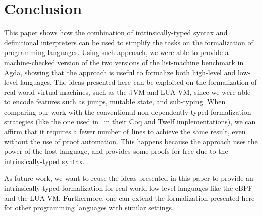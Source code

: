 \documentclass[review]{elsarticle}
\theoremstyle{definition}
\begin{document}
\vspace{-3ex}

\section{Conclusion}\label{sec:conclusion}

This paper shows how the combination of intrinsically-typed syntax and definitional interpreters can be used to simplify
the tasks on the formalization of programming languages. Using such approach, we were able to provide a machine-checked
version of the two versions of the list-machine benchmark in Agda, showing that the approach is useful to
formalize both high-level and low-level languages.
The ideas presented here can be exploited on the formalization of real-world virtual machines, such as the JVM and LUA VM,
since we were able to encode features such as jumps, mutable state, and sub-typing. When comparing our work with the
conventional non-dependently typed formalization strategies (like the one used in~\cite{Appel07} in their Coq and Twelf implementations),
we can affirm that it requires a fewer number of lines to achieve the same result, even without the use of proof automation.
This happens because the approach uses the power of the host language, and provides some proofs for free due to the
intrinsically-typed syntax.

As future work, we want to reuse the ideas presented in this paper to provide an intrinsically-typed formalization for
real-world low-level languages like the eBPF and the LUA VM. Furthermore, one can extend the formalization presented here
for other programming languages with similar settings.


\end{document}
